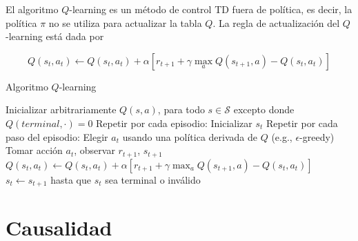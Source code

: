 
El algoritmo $Q$-learning \cite{watkins1992q} es un método de control TD fuera de política, es decir,
la política $\pi$ no se utiliza para actualizar la tabla $Q$. 
La regla de actualización del $Q$-learning está dada por 

\[
Q(s_t, a_t) \leftarrow Q(s_t, a_t) + \alpha[r_{t+1} + \gamma \max_a Q(s_{t+1}, a) - Q(s_t, a_t)]
\]

\begin{algorithm}[!hbt]
	\caption{Algoritmo $Q$-learning}
	\label{alg:q-algo}
	
	
	\SetAlgoLined\DontPrintSemicolon
    \SetAlgoHangIndent{0.5em}
	\SetAlFnt{\large} 
	
	\Input{$\alpha \in (0,1]$, $\epsilon \in (0, 1]$}
	\BlankLine
	
    Inicializar arbitrariamente $Q(s,a)$, para todo $s\in \mathcal{S}$ excepto donde $Q(terminal, \cdot) = 0$\;
	Repetir por cada episodio:\;
	\hspace{0.5cm}Inicializar $s_t$\;
	\hspace{0.5cm}Repetir por cada paso del episodio:\;
	\hspace{1cm}Elegir $a_t$ usando una política derivada de $Q$ (e.g., $\epsilon$-greedy)\;
	\hspace{1cm}Tomar acción $a_t$, observar $r_{t+1}$, $s_{t+1}$\;
	\hspace{1cm}$Q(s_t, a_t) \leftarrow Q(s_t, a_t) + \alpha [r_{t+1} + \gamma \max_a Q(s_{t+1}, a) - Q(s_t, a_t)]$\;
    \hspace{1cm}$s_t \leftarrow s_{t+1}$\;
    \hspace{0.5cm}hasta que $s_t$ sea terminal o inválido\;
\end{algorithm}


\section{Causalidad}


